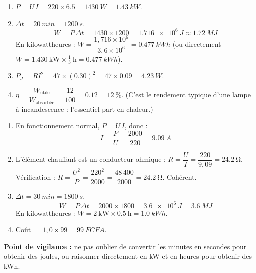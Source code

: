 \documentclass[11pt]{article}
\begin{document}
\begin{corrige}
\begin{enumerate}
\item $P = U\,I = 220 \times \num{6,5} = \SI{1430}{W} = \SI{1,43}{kW}$.
\item $\Delta t = \SI{20}{min} = \SI{1200}{s}$.
\[
W = P\,\Delta t = 1430 \times 1200 = \SI{1,716e6}{J} \approx \SI{1,72}{MJ}
\]
En kilowattheures : $W = \dfrac{1,716 \times 10^6}{3,6 \times 10^6} = \SI{0,477}{kWh}$ (ou directement $W = \num{1,430}\ \text{kW} \times \tfrac{1}{3}\ \text{h} = \SI{0,477}{kWh}$).
\item $P_J = R I^2 = 47 \times (\num{0,30})^2 = 47 \times \num{0,09} = \SI{4,23}{W}$.
\item $\eta = \dfrac{W_{\text{utile}}}{W_{\text{absorbée}}} = \dfrac{12}{100} = \num{0,12} = \SI{12}{\%}$. (C'est le rendement typique d'une lampe à incandescence : l'essentiel part en chaleur.)
\end{enumerate}
\end{corrige}

\begin{corrige}
\begin{enumerate}
\item En fonctionnement normal, $P = U\,I$, donc :
\[
I = \frac{P}{U} = \frac{2000}{220} = \SI{9,09}{A}
\]
\item L'élément chauffant est un conducteur ohmique : $R = \dfrac{U}{I} = \dfrac{220}{9,09} = \SI{24,2}{\ohm}$. Vérification : $R = \dfrac{U^2}{P} = \dfrac{220^2}{2000} = \dfrac{48\,400}{2000} = \SI{24,2}{\ohm}$. Cohérent.
\item $\Delta t = \SI{30}{min} = \SI{1800}{s}$.
\[
W = P\,\Delta t = 2000 \times 1800 = \SI{3,6e6}{J} = \SI{3,6}{MJ}
\]
En kilowattheures : $W = 2\ \text{kW} \times \num{0,5}\ \text{h} = \SI{1,0}{kWh}$.
\item Coût $= 1,0 \times 99 = \SI{99}{FCFA}$.
\end{enumerate}
\textbf{Point de vigilance :} ne pas oublier de convertir les minutes en secondes pour obtenir des joules, ou raisonner directement en kW et en heures pour obtenir des kWh.
\end{corrige}
\end{document}
